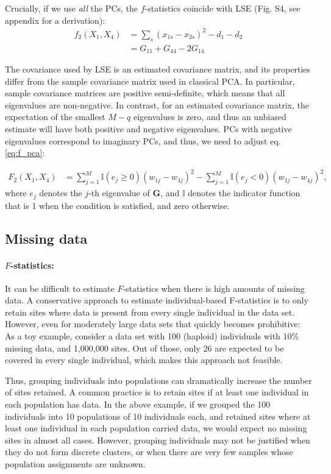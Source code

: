\documentclass[12pt, letterpaper]{article}
\begin{document}
Crucially, if we use \emph{all} the PCs, the $f$-statistics coincide with LSE (Fig. S4, see appendix for a derivation): 
\begin{align}
    f_2(X_1, X_4) &= \sum_s (x_{1s} - x_{2s})^2 - d_1 - d_2 \nonumber\\
    &= G_{11} + G_{44} - 2 G_{14}
\end{align}

The covariance used by LSE is an estimated covariance matrix, and its properties differ from the sample covariance matrix used in classical PCA. In particular, sample covariance matrices are positive semi-definite, which means that all eigenvalues are non-negative. In contrast, for an estimated covariance matrix, the expectation of the smallest $M-q$ eigenvalues is zero, and thus an unbiased estimate will have both positive and negative eigenvalues. PCs with negative eigenvalues correspond to imaginary PCs, and thus, we need to adjust eq. \ref{eq:f_pca}:


\begin{align}\label{eq:f_lse}
F_2(X_1,X_4) &= \sum_{j=1}^{M}\mathbb{I}(e_j \geq 0) (w_{1j} - w_{4j})^2 - \sum_{j=1}^M \mathbb{I}(e_j <0) (w_{1j} - w_{4j})^2,
\end{align}
where $e_j$ denotes the $j$-th eigenvalue of $\mathbf{G}$, and $\mathbb{I}$ denotes the indicator function that is 1 when the condition is satisfied, and zero otherwise.


\subsection{Missing data}

\paragraph{$F$-statistics:}
It can be difficult to estimate $F$-statistics when there is high amounts of missing data. A conservative approach to estimate individual-based F-statistics is to only retain sites where data is present from every single individual in the data set. However, even for moderately large data sets that quickly becomes prohibitive: As a toy example, consider a data set with 100 (haploid) individuals with 10\% missing data, and 1,000,000 sites. Out of those, only 26 are expected to be covered in every single individual, which makes this approach not feasible.

Thus, grouping individuals into populations can dramatically increase the number of sites retained. A common practice is to retain sites if at least one individual in each population has data. In the above example, if we grouped the 100 individuals into 10 populations of 10 individuals each, and retained sites where at least one individual in each population carried data, we would expect no missing sites in almost all cases. However, grouping individuals may not be justified when they do not form discrete clusters, or when there are very few samples whose population assignments are unknown.
\end{document}
